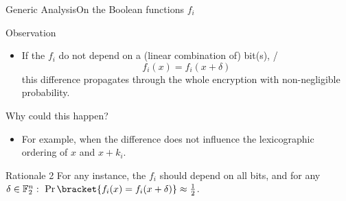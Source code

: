 \begin{frame}{Generic Analysis}{On the Boolean functions $f_i$}
    \vspace{-20pt}
    \begin{minipage}[t][85pt][t]{0.47\textwidth}
        \begin{block}{Observation\vpPp}
            \begin{itemize}
                \item If the $f_i$ do not depend on a (linear combination of) bit(s), \ie/
                    \begin{equation*}
                        f_i(x) = f_i(x + \delta)
                    \end{equation*}
                    this difference propagates through the whole encryption with non-negligible probability.
            \end{itemize}
        \end{block}
    \end{minipage}
    \hfill
    \begin{minipage}[t][85pt][t]{0.47\textwidth}
        \begin{block}{Why could this happen?}
            \begin{itemize}
                \item For example, when the difference does not influence the lexicographic ordering of $x$ and $x + k_i$.
            \end{itemize}
            \vspace{56pt}
        \end{block}
    \end{minipage}

    \vspace{50pt}

    \begin{minipage}{0.985\textwidth}
    \begin{exampleblock}{Rationale 2}
        For any instance, the $f_i$ should depend on all bits, and for any $\delta \in \F_2^n:\ \Pr\bracket{f_i(x) = f_i(x + \delta)} \approx \frac{1}{2}$.
    \end{exampleblock}
    \end{minipage}
\end{frame}

